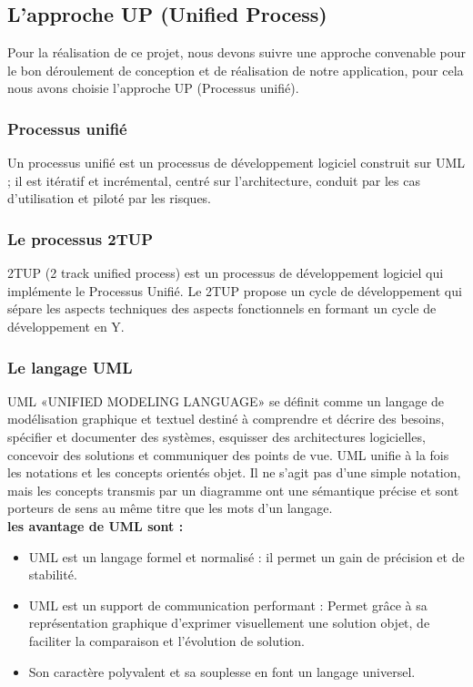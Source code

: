 \subsection{L’approche UP (Unified Process) }
\par Pour la réalisation de ce projet, nous devons suivre une approche
convenable pour le bon déroulement de conception et de réalisation de notre
application, pour cela nous avons choisie l’approche UP (Processus unifié).
\subsubsection{Processus unifié }
\par Un processus unifié est un processus de développement logiciel construit
sur UML ; il est itératif et incrémental, centré sur l’architecture, conduit
par les cas d’utilisation et piloté par les risques.\cite{ref2}
\subsubsection{Le processus 2TUP }
\par 2TUP (2 track unified process) est un processus de développement logiciel
qui implémente le Processus Unifié. Le 2TUP propose un cycle de développement
qui sépare les aspects techniques des aspects fonctionnels en formant un cycle
de développement en Y.\cite{ref2}
\subsubsection{Le langage UML }
\par UML «UNIFIED MODELING LANGUAGE» se définit comme un langage de
modélisation graphique et textuel destiné à comprendre et décrire des besoins,
spécifier et documenter des systèmes, esquisser des architectures logicielles,
concevoir des solutions et communiquer des points de vue. UML unifie à la fois
les notations et les concepts orientés objet. Il ne s’agit pas d’une simple
notation, mais les concepts transmis par un diagramme ont une sémantique
précise et sont porteurs de sens au même titre que les mots d’un
langage.\cite{ref2}\\
\textbf{les avantage  de UML sont :}
\begin{itemize}[label=\textbullet]
\item UML est un langage formel et normalisé : il permet un gain de précision
et de stabilité.
\item UML est un support de communication performant :
Permet grâce à sa représentation graphique d'exprimer visuellement une solution
objet, de faciliter la comparaison et l'évolution de solution.
\item Son caractère polyvalent et sa souplesse en font un langage universel.
\end{itemize}
